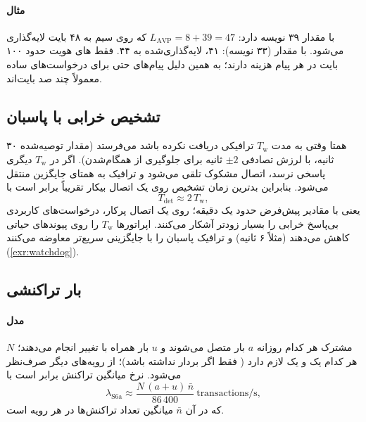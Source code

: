 \documentclass[11pt,a4paper]{article}
\begin{document}
\paragraph{مثال}  با مقدار  ۳۹ نویسه دارد:
$L_{\mathrm{AVP}} = 8+39 = 47$ که روی سیم به ۴۸ بایت لایه‌گذاری می‌شود.  با مقدار
 (۳۳ نویسه): ۴۱، لایه‌گذاری‌شده به ۴۴. فقط های هویت حدود ۱۰۰
بایت در هر پیام هزینه دارند؛ به همین دلیل پیام‌های  حتی برای درخواست‌های ساده معمولاً چند صد بایت‌اند.

\subsection{تشخیص خرابی با پاسبان}\label{sec:watchdog}
همتا وقتی به مدت $T_\mathrm{w}$ ترافیکی دریافت نکرده باشد  می‌فرستد (مقدار توصیه‌شده ۳۰ ثانیه، با لرزش تصادفی
$\pm2$ ثانیه برای جلوگیری از همگام‌شدن). اگر در $T_\mathrm{w}$ دیگری پاسخی نرسد، اتصال مشکوک تلقی می‌شود و ترافیک به
همتای جایگزین منتقل می‌شود. بنابراین بدترین زمان تشخیص روی یک اتصال بیکار تقریباً برابر است با
\begin{equation}\label{eq:tdet}
  T_{\mathrm{det}} \approx 2\,T_\mathrm{w},
\end{equation}
یعنی با مقادیر پیش‌فرض حدود یک دقیقه؛ روی یک اتصال پرکار، درخواست‌های کاربردی بی‌پاسخ خرابی را بسیار زودتر آشکار
می‌کنند. اپراتورها $T_\mathrm{w}$ را روی پیوندهای حیاتی کاهش می‌دهند (مثلاً ۶ ثانیه) و ترافیک پاسبان را با جایگزینی
سریع‌تر معاوضه می‌کنند (\cref{exr:watchdog}).

\subsection{بار تراکنشی }\label{sec:hssload}
\paragraph{مدل} $N$ مشترک هر کدام روزانه $a$ بار متصل می‌شوند و $u$ بار  همراه با تغییر  انجام
می‌دهند؛ هر کدام یک  و یک  لازم دارد ( فقط اگر  بردار نداشته باشد)؛ از رویه‌های دیگر
صرف‌نظر می‌شود. نرخ میانگین تراکنش  برابر است با
\begin{equation}\label{eq:hss}
  \lambda_{\mathrm{S6a}} \approx \frac{N\,(a+u)\,\bar n}{86\,400}\ \text{transactions/s},
\end{equation}
که در آن $\bar n$ میانگین تعداد تراکنش‌ها در هر رویه است.
\end{document}
